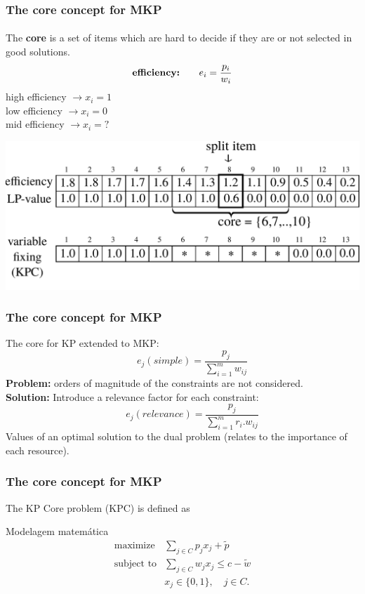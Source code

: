 \documentclass[10pt,fleqn]{beamer}
\begin{document}
\begin{frame}
	\frametitle{The core concept for MKP}
  \framesubtitle{}
  The {\bf core} is a set of items which are hard to decide if they
are or not selected in good solutions.
\begin{align*}
		\text{\bf efficiency:} \qquad e_i = \frac{p_i}{w_i}
\end{align*} \pause
	high efficiency $\rightarrow x_i = 1$ \\
	low efficiency \phantom{.} $\rightarrow x_i = 0$ \\
	mid efficiency $\rightarrow x_i = ?$\\
	  \begin{center}
        \includegraphics[scale=0.5]{../imgs/kp_3}
	  \end{center}
\end{frame}

\begin{frame}
	\frametitle{The core concept for MKP}
The core for KP extended to MKP:
\begin{displaymath}
	\qquad e_j(simple) = \frac{p_j}{\sum_{i=1}^{m} w_{ij}}
\end{displaymath}
{\bf Problem:} orders of magnitude of the constraints are not
considered. \\
\pause
{\bf Solution:} Introduce a relevance factor for each constraint:
\begin{displaymath}
	\qquad e_j(relevance) = \frac{p_j}{\sum_{i=1}^{m} r_i . w_{ij}}
\end{displaymath}
Values of an optimal solution to the dual problem
(relates to the importance of each resource).
\end{frame}

\begin{frame}
	\frametitle{The core concept for MKP}
The KP Core problem (KPC) is defined as
      \begin{block}{Modelagem matemática}
	    { \footnotesize
\begin{align*}
  \text{maximize} & \sum_{j \in C} p_j x_j  + \tilde{p}\\
  \text{subject to} & \sum_{j \in C} w_{j} x_j \leqslant c - \tilde{w}\\
  & x_j \in \{0, 1\}, \quad j \in C.
\end{align*}
		}
      \end{block}
\end{frame}
\end{document}
